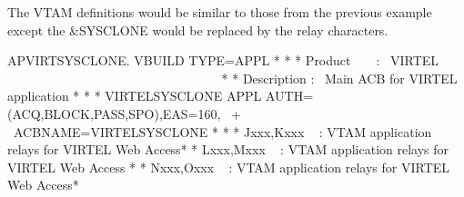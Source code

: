 \documentclass[letterpaper,10pt,english]{sphinxmanual}
\begin{document}
\sphinxAtStartPar
The VTAM definitions would be similar to those from the previous example except the \&SYSCLONE would be replaced by the relay characters.

\begin{sphinxVerbatim}[commandchars=\\\{\}]
APVIRT\PYGZam{}SYSCLONE. VBUILD TYPE=APPL
* \PYGZhy{}\PYGZhy{}\PYGZhy{}\PYGZhy{}\PYGZhy{}\PYGZhy{}\PYGZhy{}\PYGZhy{}\PYGZhy{}\PYGZhy{}\PYGZhy{}\PYGZhy{}\PYGZhy{}\PYGZhy{}\PYGZhy{}\PYGZhy{}\PYGZhy{}\PYGZhy{}\PYGZhy{}\PYGZhy{}\PYGZhy{}\PYGZhy{}\PYGZhy{}\PYGZhy{}\PYGZhy{}\PYGZhy{}\PYGZhy{}\PYGZhy{}\PYGZhy{}\PYGZhy{}\PYGZhy{}\PYGZhy{}\PYGZhy{}\PYGZhy{}\PYGZhy{}\PYGZhy{}\PYGZhy{}\PYGZhy{}\PYGZhy{}\PYGZhy{}\PYGZhy{}\PYGZhy{}\PYGZhy{}\PYGZhy{}\PYGZhy{}\PYGZhy{}\PYGZhy{}\PYGZhy{}\PYGZhy{}\PYGZhy{}\PYGZhy{}\PYGZhy{}\PYGZhy{}\PYGZhy{}\PYGZhy{}\PYGZhy{}\PYGZhy{}\PYGZhy{}\PYGZhy{}\PYGZhy{}\PYGZhy{}\PYGZhy{}\PYGZhy{}\PYGZhy{}\PYGZhy{}\PYGZhy{}*
* Product     :  VIRTEL                                             *
* Description :  Main ACB for VIRTEL application                    *
* \PYGZhy{}\PYGZhy{}\PYGZhy{}\PYGZhy{}\PYGZhy{}\PYGZhy{}\PYGZhy{}\PYGZhy{}\PYGZhy{}\PYGZhy{}\PYGZhy{}\PYGZhy{}\PYGZhy{}\PYGZhy{}\PYGZhy{}\PYGZhy{}\PYGZhy{}\PYGZhy{}\PYGZhy{}\PYGZhy{}\PYGZhy{}\PYGZhy{}\PYGZhy{}\PYGZhy{}\PYGZhy{}\PYGZhy{}\PYGZhy{}\PYGZhy{}\PYGZhy{}\PYGZhy{}\PYGZhy{}\PYGZhy{}\PYGZhy{}\PYGZhy{}\PYGZhy{}\PYGZhy{}\PYGZhy{}\PYGZhy{}\PYGZhy{}\PYGZhy{}\PYGZhy{}\PYGZhy{}\PYGZhy{}\PYGZhy{}\PYGZhy{}\PYGZhy{}\PYGZhy{}\PYGZhy{}\PYGZhy{}\PYGZhy{}\PYGZhy{}\PYGZhy{}\PYGZhy{}\PYGZhy{}\PYGZhy{}\PYGZhy{}\PYGZhy{}\PYGZhy{}\PYGZhy{}\PYGZhy{}\PYGZhy{}\PYGZhy{}\PYGZhy{}\PYGZhy{}\PYGZhy{}\PYGZhy{}*
VIRTEL\PYGZam{}SYSCLONE APPL AUTH=(ACQ,BLOCK,PASS,SPO),EAS=160,               +
             ACBNAME=VIRTEL\PYGZam{}SYSCLONE
* \PYGZhy{}\PYGZhy{}\PYGZhy{}\PYGZhy{}\PYGZhy{}\PYGZhy{}\PYGZhy{}\PYGZhy{}\PYGZhy{}\PYGZhy{}\PYGZhy{}\PYGZhy{}\PYGZhy{}\PYGZhy{}\PYGZhy{}\PYGZhy{}\PYGZhy{}\PYGZhy{}\PYGZhy{}\PYGZhy{}\PYGZhy{}\PYGZhy{}\PYGZhy{}\PYGZhy{}\PYGZhy{}\PYGZhy{}\PYGZhy{}\PYGZhy{}\PYGZhy{}\PYGZhy{}\PYGZhy{}\PYGZhy{}\PYGZhy{}\PYGZhy{}\PYGZhy{}\PYGZhy{}\PYGZhy{}\PYGZhy{}\PYGZhy{}\PYGZhy{}\PYGZhy{}\PYGZhy{}\PYGZhy{}\PYGZhy{}\PYGZhy{}\PYGZhy{}\PYGZhy{}\PYGZhy{}\PYGZhy{}\PYGZhy{}\PYGZhy{}\PYGZhy{}\PYGZhy{}\PYGZhy{}\PYGZhy{}\PYGZhy{}\PYGZhy{}\PYGZhy{}\PYGZhy{}\PYGZhy{}\PYGZhy{}\PYGZhy{}\PYGZhy{}\PYGZhy{}\PYGZhy{}\PYGZhy{}*
* Jxxx,Kxxx   : VTAM application relays for VIRTEL Web Access*
* Lxxx,Mxxx   : VTAM application relays for VIRTEL Web Access *
* Nxxx,Oxxx   : VTAM application relays for VIRTEL Web Access*

\end{sphinxVerbatim}
\end{document}
